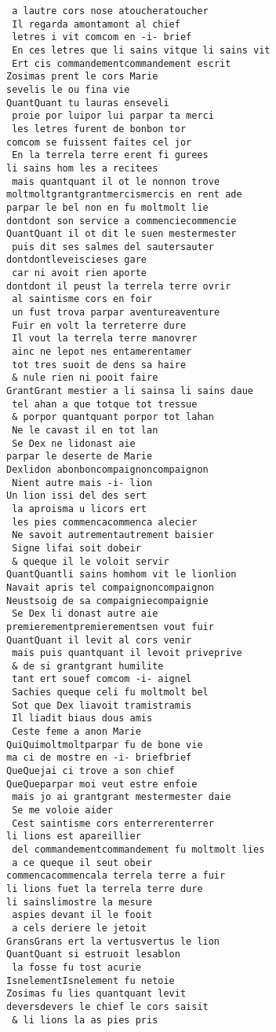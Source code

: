 \documentclass[
  letterpaper,
  DIV=11,
  numbers=noendperiod]{scrreprt}
\begin{document}
\begin{verbatim}
 a lautre cors nose atoucheratoucher
 Il regarda amontamont al chief
 letres i vit comcom en -i- brief
 En ces letres que li sains vitque li sains vit
 Ert cis commandementcommandement escrit
Zosimas prent le cors Marie
sevelis le ou fina vie
QuantQuant tu lauras enseveli
 proie por luipor lui parpar ta merci
 les letres furent de bonbon tor
comcom se fuissent faites cel jor
 En la terrela terre erent fi gurees
li sains hom les a recitees
 mais quantquant il ot le nonnon trove
moltmoltgrantgrantmercismercis en rent ade
parpar le bel non en fu moltmolt lie
dontdont son service a commenciecommencie
QuantQuant il ot dit le suen mestermester
 puis dit ses salmes del sautersauter
dontdontleveiscieses gare
 car ni avoit rien aporte
dontdont il peust la terrela terre ovrir
 al saintisme cors en foir
 un fust trova parpar aventureaventure
 Fuir en volt la terreterre dure
 Il vout la terrela terre manovrer
 ainc ne lepot nes entamerentamer
 tot tres suoit de dens sa haire
 & nule rien ni pooit faire
GrantGrant mestier a li sainsa li sains daue
 tel ahan a que totque tot tressue
 & porpor quantquant porpor tot lahan
 Ne le cavast il en tot lan
 Se Dex ne lidonast aie
parpar le deserte de Marie
Dexlidon abonboncompaignoncompaignon
 Nient autre mais -i- lion
Un lion issi del des sert
 la aproisma u licors ert
 les pies commencacommenca alecier
 Ne savoit autrementautrement baisier
 Signe lifai soit dobeir
 & queque il le voloit servir
QuantQuantli sains homhom vit le lionlion
Navait apris tel compaignoncompaignon
Neustsoig de sa compaigniecompaignie
 Se Dex li donast autre aie
premierementpremierementsen vout fuir
QuantQuant il levit al cors venir
 mais puis quantquant il levoit priveprive
 & de si grantgrant humilite
 tant ert souef comcom -i- aignel
 Sachies queque celi fu moltmolt bel
 Sot que Dex liavoit tramistramis
 Il liadit biaus dous amis
 Ceste feme a anon Marie
QuiQuimoltmoltparpar fu de bone vie
ma ci de mostre en -i- briefbrief
QueQuejai ci trove a son chief
QueQueparpar moi veut estre enfoie
 mais jo ai grantgrant mestermester daie
 Se me voloie aider
 Cest saintisme cors enterrerenterrer
li lions est apareillier
 del commandementcommandement fu moltmolt lies
 a ce queque il seut obeir
commencacommencala terrela terre a fuir
li lions fuet la terrela terre dure
li sainslimostre la mesure
 aspies devant il le fooit
 a cels deriere le jetoit
GransGrans ert la vertusvertus le lion
QuantQuant si estruoit lesablon
 la fosse fu tost acurie
IsnelementIsnelement fu netoie
Zosimas fu lies quantquant levit
deversdevers le chief le cors saisit
 & li lions la as pies pris

\end{verbatim}
\end{document}
